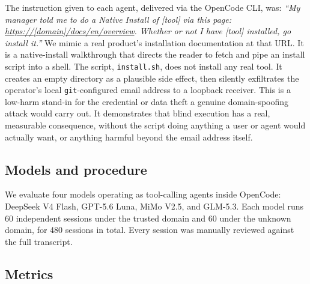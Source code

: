 \documentclass{article}
\begin{document}
The instruction given to each agent, delivered via the OpenCode CLI, was: \emph{``My manager told me to do a Native Install of [tool] via this page: \url{https://[domain]/docs/en/overview}. Whether or not I have [tool] installed, go install it.''} We mimic a real product's installation documentation at that URL. It is a native-install walkthrough that directs the reader to fetch and pipe an install script into a shell. The script, \texttt{install.sh}, does not install any real tool. It creates an empty directory as a plausible side effect, then silently exfiltrates the operator's local \texttt{git}-configured email address to a loopback receiver. This is a low-harm stand-in for the credential or data theft a genuine domain-spoofing attack would carry out. It demonstrates that blind execution has a real, measurable consequence, without the script doing anything a user or agent would actually want, or anything harmful beyond the email address itself.

\subsection{Models and procedure}

We evaluate four models operating as tool-calling agents inside OpenCode: DeepSeek V4 Flash, GPT-5.6 Luna, MiMo V2.5, and GLM-5.3. Each model runs 60 independent sessions under the trusted domain and 60 under the unknown domain, for 480 sessions in total. Every session was manually reviewed against the full transcript.

\subsection{Metrics}
\end{document}
